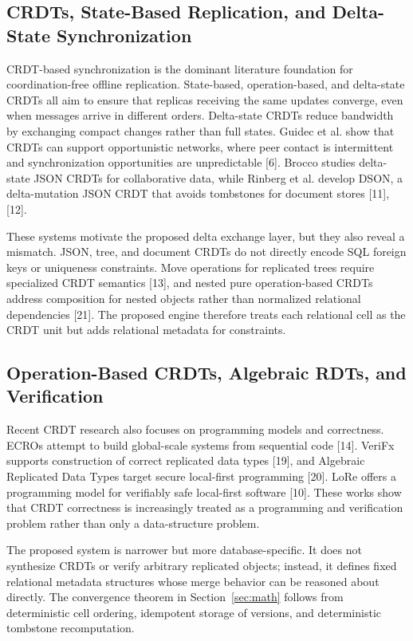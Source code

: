 \documentclass[pdflatex,sn-mathphys-num]{sn-jnl}
\begin{document}
\subsection{CRDTs, State-Based Replication, and Delta-State Synchronization}

CRDT-based synchronization is the dominant literature foundation for coordination-free offline replication. State-based, operation-based, and delta-state CRDTs all aim to ensure that replicas receiving the same updates converge, even when messages arrive in different orders. Delta-state CRDTs reduce bandwidth by exchanging compact changes rather than full states. Guidec et al. show that CRDTs can support opportunistic networks, where peer contact is intermittent and synchronization opportunities are unpredictable [6]. Brocco studies delta-state JSON CRDTs for collaborative data, while Rinberg et al. develop DSON, a delta-mutation JSON CRDT that avoids tombstones for document stores [11], [12].

These systems motivate the proposed delta exchange layer, but they also reveal a mismatch. JSON, tree, and document CRDTs do not directly encode SQL foreign keys or uniqueness constraints. Move operations for replicated trees require specialized CRDT semantics [13], and nested pure operation-based CRDTs address composition for nested objects rather than normalized relational dependencies [21]. The proposed engine therefore treats each relational cell as the CRDT unit but adds relational metadata for constraints.

\subsection{Operation-Based CRDTs, Algebraic RDTs, and Verification}

Recent CRDT research also focuses on programming models and correctness. ECROs attempt to build global-scale systems from sequential code [14]. VeriFx supports construction of correct replicated data types [19], and Algebraic Replicated Data Types target secure local-first programming [20]. LoRe offers a programming model for verifiably safe local-first software [10]. These works show that CRDT correctness is increasingly treated as a programming and verification problem rather than only a data-structure problem.

The proposed system is narrower but more database-specific. It does not synthesize CRDTs or verify arbitrary replicated objects; instead, it defines fixed relational metadata structures whose merge behavior can be reasoned about directly. The convergence theorem in Section~\ref{sec:math} follows from deterministic cell ordering, idempotent storage of versions, and deterministic tombstone recomputation.
\end{document}
